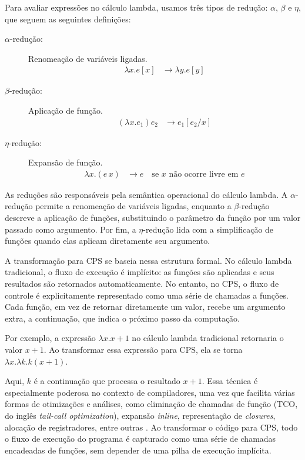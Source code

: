 Para avaliar expressões no cálculo lambda, usamos três tipos de redução: $\alpha$, $\beta$ e $\eta$, que seguem as seguintes definições:

\begin{description}
  \item[$\alpha$-redução:] Renomeação de variáveis ligadas.
        \begin{align}
          \lambda x . e[x] & \rightarrow \lambda y . e[y] \label{eq:alpha-reduction}
        \end{align}

  \item[$\beta$-redução:] Aplicação de função.
        \begin{align}
          (\lambda x . e_1) e_2 & \rightarrow e_1 [e_2 / x] \label{eq:beta-reduction}
        \end{align}

  \item[$\eta$-redução:] Expansão de função.
        \begin{align}
          \lambda x . (e \, x) & \rightarrow e \quad \text{se } x \text{ não ocorre livre em } e \label{eq:eta-reduction}
        \end{align}
\end{description}

As reduções são responsáveis pela semântica operacional do cálculo lambda.
A $\alpha$-redução permite a renomeação de variáveis ligadas, enquanto a $\beta$-redução descreve a aplicação de funções, substituindo o parâmetro da função por um valor passado como argumento.
Por fim, a $\eta$-redução lida com a simplificação de funções quando elas aplicam diretamente seu argumento.

A transformação para CPS se baseia nessa estrutura formal.
No cálculo lambda tradicional, o fluxo de execução é implícito: as funções são aplicadas e seus resultados são retornados automaticamente.
No entanto, no CPS, o fluxo de controle é explicitamente representado como uma série de chamadas a funções.
Cada função, em vez de retornar diretamente um valor, recebe um argumento extra, a continuação, que indica o próximo passo da computação.

Por exemplo, a expressão $\lambda x. x + 1$ no cálculo lambda tradicional retornaria o valor $x + 1$. Ao transformar essa expressão para CPS, ela se torna $\lambda x. \lambda k. k (x + 1)$.

Aqui, $k$ é a continuação que processa o resultado $x + 1$.
Essa técnica é especialmente poderosa no contexto de compiladores, uma vez que facilita várias formas de otimizações e análises, como eliminação de chamadas de função (TCO, do inglês \textit{tail-call optimization}), expansão \textit{inline}, representação de \textit{closures}, alocação de registradores, entre outras \cite{appel1992compiling}.
Ao transformar o código para CPS, todo o fluxo de execução do programa é capturado como uma série de chamadas encadeadas de funções, sem depender de uma pilha de execução implícita.

